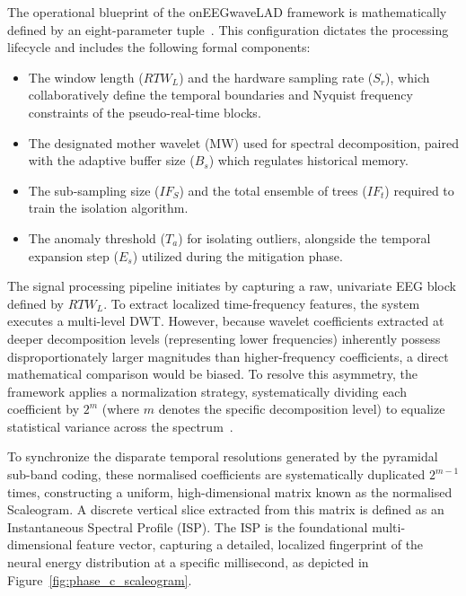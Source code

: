 \documentclass[MScCS,12pt,oneside,final]{uccthesis}
\begin{document}
        The operational blueprint of the onEEGwaveLAD framework is mathematically defined by an eight-parameter tuple~\parencite{longo2025oneegwavelad}. This configuration dictates the processing lifecycle and includes the following formal components:
        \begin{itemize}
            \item The window length ($RTW_L$) and the hardware sampling rate ($S_r$), which collaboratively define the temporal boundaries and Nyquist frequency constraints of the pseudo-real-time blocks.
            \item The designated mother wavelet (MW) used for spectral decomposition, paired with the adaptive buffer size ($B_s$) which regulates historical memory.
            \item The sub-sampling size ($IF_S$) and the total ensemble of trees ($IF_t$) required to train the isolation algorithm.
            \item The anomaly threshold ($T_a$) for isolating outliers, alongside the temporal expansion step ($E_s$) utilized during the mitigation phase.
        \end{itemize}

        The signal processing pipeline initiates by capturing a raw, univariate EEG block defined by $RTW_L$. To extract localized time-frequency features, the system executes a multi-level DWT. However, because wavelet coefficients extracted at deeper decomposition levels (representing lower frequencies) inherently possess disproportionately larger magnitudes than higher-frequency coefficients, a direct mathematical comparison would be biased. To resolve this asymmetry, the framework applies a normalization strategy, systematically dividing each coefficient by $2^m$ (where $m$ denotes the specific decomposition level) to equalize statistical variance across the spectrum~\parencite{longo2025oneegwavelad}.
        
        To synchronize the disparate temporal resolutions generated by the pyramidal sub-band coding, these normalised coefficients are systematically duplicated $2^{m-1}$ times, constructing a uniform, high-dimensional matrix known as the normalised Scaleogram. A discrete vertical slice extracted from this matrix is defined as an Instantaneous Spectral Profile (ISP). The ISP is the foundational multi-dimensional feature vector, capturing a 
detailed, localized fingerprint of the neural energy distribution at a specific 
millisecond, as depicted in Figure~\ref{fig:phase_c_scaleogram}.
        
\end{document}
